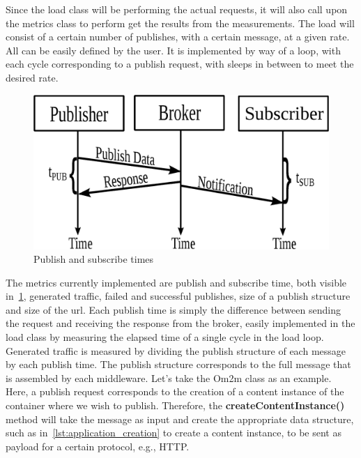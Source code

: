 \documentclass[conference]{IEEEtran}
\begin{document}
Since the load class will be performing the actual requests, it will also call upon the metrics class to perform get the results from the measurements. The load will consist of a certain number of publishes, with a certain message, at a given rate. All can be easily defined by the user. It is implemented by way of a loop, with each cycle corresponding to a publish request, with sleeps in between to meet the desired rate.

\begin{figure}[htbp!]
  \centering
  \includegraphics[width=\linewidth]{figures/pub_sub_time.eps}
  \caption{Publish and subscribe times~\cite{cardoso_benchmarking_2017}}
  \label{fig:pub_sub_time}
\end{figure}

The metrics currently implemented are publish and subscribe time, both visible in~\ref{fig:pub_sub_time}, generated traffic, failed and successful publishes, size of a publish structure and size of the url. Each publish time is simply the difference between sending the request and receiving the response from the broker, easily implemented in the load class by measuring the elapsed time of a single cycle in the load loop.
Generated traffic is measured by dividing the publish structure of each message by each publish time. The publish structure corresponds to the full message that is assembled by each middleware. Let's take the Om2m class as an example. Here, a publish request corresponds to the creation of a content instance of the container where we wish to publish. Therefore, the \textbf{createContentInstance()} method will take the message as input and create the appropriate data structure, such as in~\ref{lst:application_creation} to create a content instance, to be sent as payload for a certain protocol, e.g., HTTP\@.
\end{document}
